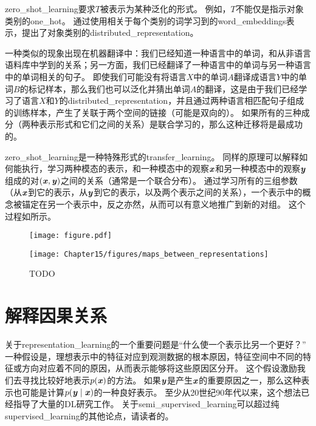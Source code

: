 
\gls{zero_shot_learning}要求$T$被表示为某种泛化的形式。
例如，$T$不能仅是指示对象类别的\gls{one_hot}。
通过使用相关于每个类别的词学习到的\gls{word_embeddings}表示，\cite{Socher-2013}提出了对象类别的\gls{distributed_representation}。


一种类似的现象出现在机器翻译中\citep{Klementiev-et-al-COLING2012,Mikolov-et-al-arxiv2013,Gouws-et-al-arxiv2014}：我们已经知道一种语言中的单词，和从非语言语料库中学到的关系；另一方面，我们已经翻译了一种语言中的单词与另一种语言中的单词相关的句子。
即使我们可能没有将语言$X$中的单词$A$翻译成语言$Y$中的单词$B$的标记样本，那么我们也可以泛化并猜出单词$A$的翻译，这是由于我们已经学习了语言$X$和$Y$的\gls{distributed_representation}，并且通过两种语言相匹配句子组成的训练样本，产生了关联于两个空间的链接（可能是双向的）。
如果所有的三种成分（两种表示形式和它们之间的关系）是联合学习的，那么这种迁移将是最成功的。


\gls{zero_shot_learning}是一种特殊形式的\gls{transfer_learning}。
同样的原理可以解释如何能执行，学习两种模态的表示，和一种模态中的观察$\boldsymbol{\mathit{x}}$和另一种模态中的观察$\boldsymbol{\mathit{y}}$组成的对$(\boldsymbol{\mathit{x}}, \boldsymbol{\mathit{y}})$之间的关系（通常是一个联合分布）\citep{Srivastava+Salakhutdinov-NIPS2012-small}。
通过学习所有的三组参数（从$\boldsymbol{\mathit{x}}$到它的表示，从$\boldsymbol{\mathit{y}}$到它的表示，以及两个表示之间的关系），一个表示中的概念被锚定在另一个表示中，反之亦然，从而可以有意义地推广到新的对组。
这个过程如所示。

\begin{figure}[!htb]
\ifOpenSource
\centerline{\texttt{[image: figure.pdf]}}
\else
\centerline{\texttt{[image: Chapter15/figures/maps\_between\_representations]}}
\fi
\caption{TODO}
\label{fig:chap15_maps_between_representations}
\end{figure}


\section{解释因果关系}
\label{sec:semi_supervised_disentangling_of_causal_factors}
关于\gls{representation_learning}的一个重要问题是``什么使一个表示比另一个更好？''
一种假设是，理想表示中的特征对应到观测数据的根本原因，特征空间中不同的特征或方向对应着不同的原因，从而表示能够将这些原因区分开。
这个假设激励我们去寻找比较好地表示$p(\boldsymbol{\mathit{x}})$的方法。
如果$\boldsymbol{\mathit{y}}$是产生$\boldsymbol{\mathit{x}}$的重要原因之一，那么这种表示也可能是计算$p(\boldsymbol{\mathit{y}} \mid \boldsymbol{\mathit{x}})$的一种良好表示。
至少从20世纪90年代以来，这个想法已经指导了大量的\gls{DL}研究工作\citep{Becker92,hinton1999unsupervised}。
关于\gls{semi_supervised_learning}可以超过纯\gls{supervised_learning}的其他论点，请读者\cite{Chapelle-2006}的。


